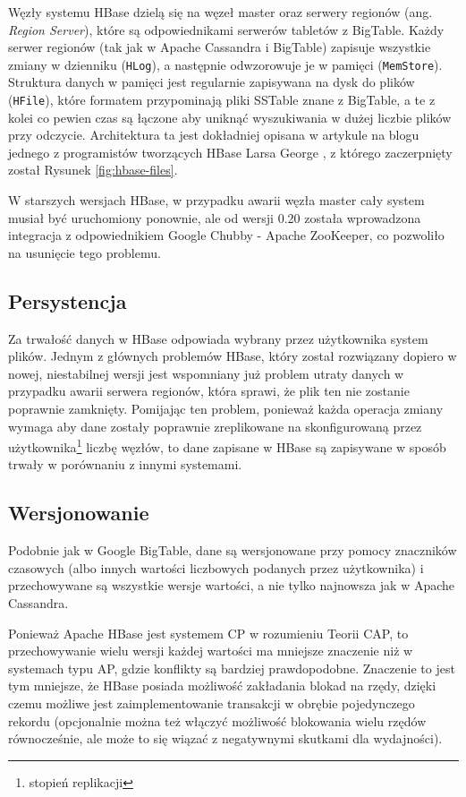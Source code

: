 Węzły systemu HBase dzielą się na węzeł master oraz serwery regionów (ang. \emph{Region Server}), które są odpowiednikami serwerów tabletów z BigTable.
Każdy serwer regionów (tak jak w Apache Cassandra i BigTable) zapisuje wszystkie zmiany w dzienniku (\verb+HLog+), a następnie odwzorowuje je w pamięci (\verb+MemStore+).
Struktura danych w pamięci jest regularnie zapisywana na dysk do plików (\verb+HFile+), które formatem przypominają pliki SSTable znane z BigTable, a te z kolei co pewien czas są łączone aby uniknąć wyszukiwania w dużej liczbie plików przy odczycie.
Architektura ta jest dokładniej opisana w artykule na blogu jednego z programistów tworzących HBase Larsa George \cite{george-hbase-storage}, z którego zaczerpnięty został Rysunek \ref{fig:hbase-files}. 


W starszych wersjach HBase, w przypadku awarii węzła master cały system musiał być uruchomiony ponownie, ale od wersji 0.20 została wprowadzona integracja z odpowiednikiem Google Chubby - Apache ZooKeeper, co pozwoliło na usunięcie tego problemu.

\subsection*{Persystencja}

Za trwałość danych w HBase odpowiada wybrany przez użytkownika system plików.
Jednym z głównych problemów HBase, który został rozwiązany dopiero w nowej, niestabilnej wersji jest wspomniany już problem utraty danych w przypadku awarii serwera regionów, która sprawi, że plik ten nie zostanie poprawnie zamknięty.
Pomijając ten problem, ponieważ każda operacja zmiany wymaga aby dane zostały poprawnie zreplikowane na skonfigurowaną przez użytkownika\footnote{stopień replikacji} liczbę węzłów, to dane zapisane w HBase są zapisywane w sposób trwały w porównaniu z innymi systemami.

\subsection*{Wersjonowanie}

Podobnie jak w Google BigTable, dane są wersjonowane przy pomocy znaczników czasowych (albo innych wartości liczbowych podanych przez użytkownika) i przechowywane są wszystkie wersje wartości, a nie tylko najnowsza jak w Apache Cassandra.

Ponieważ Apache HBase jest systemem CP w rozumieniu Teorii CAP, to przechowywanie wielu wersji każdej wartości ma mniejsze znaczenie niż w systemach typu AP, gdzie konflikty są bardziej prawdopodobne.
Znaczenie to jest tym mniejsze, że HBase posiada możliwość zakładania blokad na rzędy, dzięki czemu możliwe jest zaimplementowanie transakcji w obrębie pojedynczego rekordu (opcjonalnie można też włączyć możliwość blokowania wielu rzędów równocześnie, ale może to się wiązać z negatywnymi skutkami dla wydajności).

